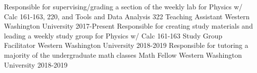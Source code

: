 

\begin{cventries}
\cventry
    {Responsible for supervising/grading a section of the weekly lab for Physics w/ Calc 161-163, 220, and Tools and Data Analysis 322}
    {Teaching Assistant}
    {Western Washington University}
    {2017-Present}{}
    \vspace{-0.3cm}
\cventry
    {Responsible for creating study materials and leading a weekly study group for Physics w/ Calc 161-163}
    {Study Group Facilitator}
    {Western Washington University}
    {2018-2019}{}
    \vspace{-0.3cm}
\cventry
    {Responsible for tutoring a majority of the undergraduate math classes}
    {Math Fellow}
    {Western Washington University}
    {2018-2019}{}
\end{cventries}

